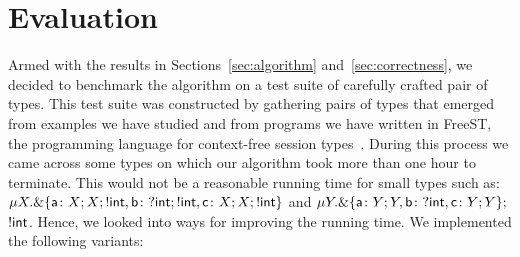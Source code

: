 \section{Evaluation}
\label{sec:evaluation}

Armed with the results in Sections~\ref{sec:algorithm}
and~\ref{sec:correctness}, we decided to benchmark the algorithm on a
test suite of carefully crafted pair of types. This test suite was constructed by
gathering pairs of types that emerged from examples we have studied
and from programs we have written in FreeST, the programming language
for context-free session
types~\cite{almeida.etal_freest-functional-language}. 
During this process we came across 
some types
%
%
on which our algorithm took more than one hour
to terminate. This would not be a reasonable running time for small 
types such as: 
$\mu X . \&\{ \mathsf{a}\colon X;X; !\mathsf{int},
    \mathsf{b}\colon ?\mathsf{int};!\mathsf{int},
    \mathsf{c}\colon X;X;!\mathsf{int} \}$
and 
$\mu Y . \&\{ \mathsf{a}\colon Y;Y,
    \mathsf{b}\colon ?\mathsf{int},
    \mathsf{c}\colon Y;Y \};$ $ !\mathsf{int}$.
Hence, we
looked into ways for improving the running time. 
We implemented the
following variants: 
